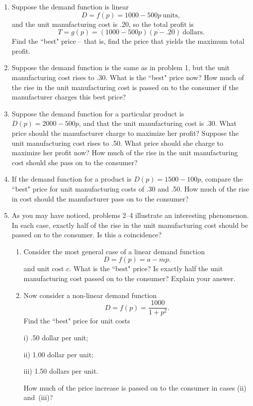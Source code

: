 \begin{enumerate}
\item Suppose the demand function is linear
\[
D = f(p) = 1000 - 500p \  \mbox{units},
\]
and the unit manufacturing cost is .20, so the total profit is
\[
T = g(p) = (1000 - 500p)(p-.20) \  \mbox{dollars}.
\]
Find the ``best" price -- that is, find the price that yields the
maximum total profit.


\item Suppose the demand function is the same as in problem 1, but the
unit manufacturing cost rises to .30.  What is the ``best" price now?
How much of the rise in the unit manufacturing cost is passed on to
the consumer if the manufacturer charges this best price?


\item Suppose the demand function for a particular product is $D(p)=
2000-500p$, and that the unit manufacturing cost is .30.  What price
should the manufacturer charge to maximize her profit?  Suppose the
unit manufacturing cost rises to .50.  What price should she charge to
maximize her profit now?  How much of the rise in the unit
manufacturing cost should she pass on to the consumer?


\item If the demand function for a product is $D(p)=1500-100p$, compare
the ``best" price for unit manufacturing costs of .30 and .50.  How
much of the rise in cost should the manufacturer pass on to the
consumer?


\item As you may have noticed, problems 2--4 illustrate an interesting
phenomenon.  In each case, exactly half of the rise in the unit
manufacturing cost should be passed on to the consumer.  Is this a
coincidence?

  \begin{enumerate}
  \item Consider the most general case of a linear demand function
\[
D=f(p) = a-mp.
\]
and unit cost $c$.  What is the ``best" price?  Is exactly half the
unit manufacturing cost passed on to the consumer?  Explain your
answer.

  \item Now consider a non-linear demand function
\[
D = f(p) = \frac{1000}{1+p^2}.
\]
Find the ``best" price for unit costs

	i) .50 dollar per unit;

	ii) 1.00 dollar per unit;

	iii) 1.50 dollars per unit.


How much of the price increase is passed on to the consumer in cases
(ii) and~(iii)?

\end{enumerate}
\end{enumerate}
